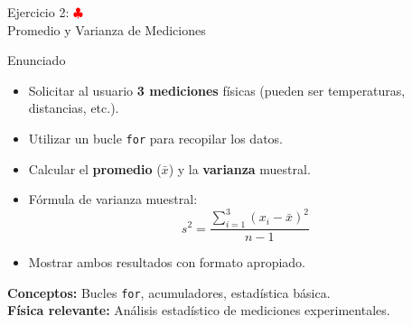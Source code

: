 \documentclass[10pt]{beamer}
\begin{document}
\begin{frame}{Ejercicio 2: \hfill \textcolor{red}{$\clubsuit$} \\ Promedio y Varianza de Mediciones}
  \begin{block}{Enunciado}
    \begin{itemize}
      \item Solicitar al usuario \textbf{3 mediciones} físicas (pueden ser temperaturas, distancias, etc.).
      \item Utilizar un bucle \texttt{for} para recopilar los datos.
      \item Calcular el \textbf{promedio} (\(\bar{x}\)) y la \textbf{varianza} muestral.
      \item Fórmula de varianza muestral:
      \[
        s^2 = \frac{\sum_{i=1}^{3}(x_i - \bar{x})^2}{n - 1}
      \]
      \item Mostrar ambos resultados con formato apropiado.
    \end{itemize}
  \end{block}
  
  \textbf{Conceptos:} Bucles \texttt{for}, acumuladores, estadística básica.
  \\
  \textbf{Física relevante:} Análisis estadístico de mediciones experimentales.
\end{frame}
\end{document}
